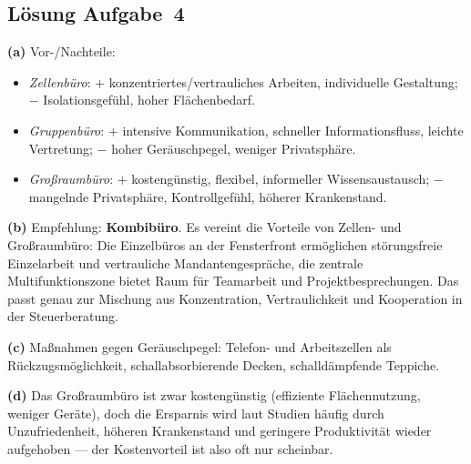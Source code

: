 \documentclass[11pt, a4paper]{article}
\begin{document}
\subsection*{Lösung Aufgabe~4}
\begin{loesung}
\textbf{(a)} Vor-/Nachteile:
\begin{itemize}[itemsep=0pt]
  \item \emph{Zellenbüro}: $+$ konzentriertes/vertrauliches Arbeiten, individuelle Gestaltung; $-$ Isolationsgefühl, hoher Flächenbedarf.
  \item \emph{Gruppenbüro}: $+$ intensive Kommunikation, schneller Informationsfluss, leichte Vertretung; $-$ hoher Geräuschpegel, weniger Privatsphäre.
  \item \emph{Großraumbüro}: $+$ kostengünstig, flexibel, informeller Wissensaustausch; $-$ mangelnde Privatsphäre, Kontrollgefühl, höherer Krankenstand.
\end{itemize}

\textbf{(b)} Empfehlung: \textbf{Kombibüro}. Es vereint die Vorteile von Zellen- und
Großraumbüro: Die Einzelbüros an der Fensterfront ermöglichen störungsfreie Einzelarbeit
und vertrauliche Mandantengespräche, die zentrale Multifunktionszone bietet Raum für
Teamarbeit und Projektbesprechungen. Das passt genau zur Mischung aus Konzentration,
Vertraulichkeit und Kooperation in der Steuerberatung.

\textbf{(c)} Maßnahmen gegen Geräuschpegel: Telefon- und Arbeitszellen als
Rückzugsmöglichkeit, schallabsorbierende Decken, schalldämpfende Teppiche.

\textbf{(d)} Das Großraumbüro ist zwar kostengünstig (effiziente Flächennutzung, weniger
Geräte), doch die Ersparnis wird laut Studien häufig durch Unzufriedenheit, höheren
Krankenstand und geringere Produktivität wieder aufgehoben --- der Kostenvorteil ist
also oft nur scheinbar.
\end{loesung}
\end{document}
